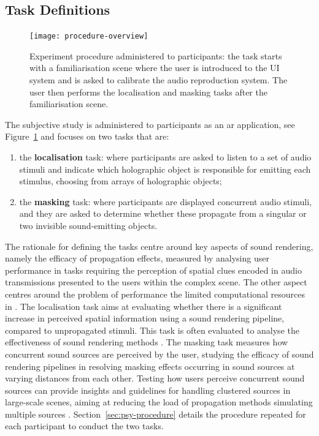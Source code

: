 \subsection{Task Definitions}
\begin{figure}[htbp]%
    \centering
    \texttt{[image: procedure-overview]}
    \caption{Experiment procedure administered to participants: the task starts with a familiarisation scene where the user is introduced to the UI system and is asked to calibrate the audio reproduction system. The user then performs the localisation and masking tasks after the familiarisation scene.}
    \label{fig:psycho-procedure-overview}
\end{figure}
The subjective study is administered to participants as an \acrshort{ar} application, see Figure~\ref{fig:psycho-procedure-overview} and focuses on two tasks that are:
\begin{enumerate}
    \item the \textbf{localisation} task: where participants are asked to listen to a set of audio stimuli and indicate which holographic object is responsible for emitting each stimulus, choosing from arrays of holographic objects;
    \item the \textbf{masking} task: where participants are displayed concurrent audio stimuli, and they are asked to determine whether these propagate from a singular or two invisible sound-emitting objects.
\end{enumerate}
The rationale for defining the tasks centre around key aspects of sound rendering, namely the efficacy of propagation effects, measured by analysing user performance in tasks requiring the perception of spatial clues encoded in audio transmissions presented to the users within the complex scene. The other aspect centres around the problem of performance the limited computational resources in .
The localisation task aims at evaluating whether there is a significant increase in perceived spatial information using a sound rendering pipeline, compared to unpropagated stimuli. This task is often evaluated to analyse the effectiveness of sound rendering methods \citep{rungta2016psychoacoustic}.
The masking task measures how concurrent sound sources are perceived by the user, studying the efficacy of sound rendering pipelines in resolving masking effects occurring in sound sources at varying distances from each other. Testing how users perceive concurrent sound sources can provide insights and guidelines for handling clustered sources in large-scale scenes, aiming at reducing the load of propagation methods simulating multiple sources \citep{schissler2016interactive}.
Section~\ref{sec:psy-procedure} details the procedure repeated for each participant to conduct the two tasks.

